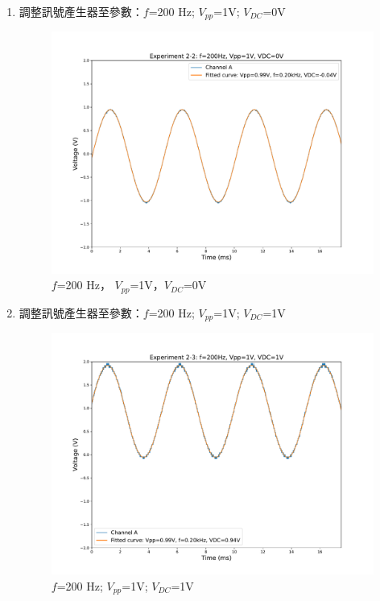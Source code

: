 \documentclass[12pt,a4paper]{article}
\begin{document}
\begin{CJK}{UTF8}{bkai}
\begin{enumerate}
    \clearpage
    \item 調整訊號產生器至參數：$f$=200 Hz; $V_{pp}$=1V; $V_{DC}$=0V
    \begin{figure}[h]
        \centering
        \vspace{-0.8cm}
        \includegraphics[width=0.75\linewidth]{figures/exp2/exp2-2.pdf}
        \vspace{-0.5cm}
        \caption{$f$=200 Hz， $V_{pp}$=1V，$V_{DC}$=0V}
        \label{fig:exp2_2}
    \end{figure}
    
    \item 調整訊號產生器至參數：$f$=200 Hz; $V_{pp}$=1V; $V_{DC}$=1V
    \begin{figure}[h]
        \centering
        \vspace{-0.8cm}
        \includegraphics[width=0.75\linewidth]{figures/exp2/exp2-3.pdf}
        \vspace{-0.5cm}
        \caption{$f$=200 Hz; $V_{pp}$=1V; $V_{DC}$=1V}
        \label{fig:exp2_3}
    \end{figure}
    \clearpage
    

\end{enumerate}
\end{CJK}
\end{document}
